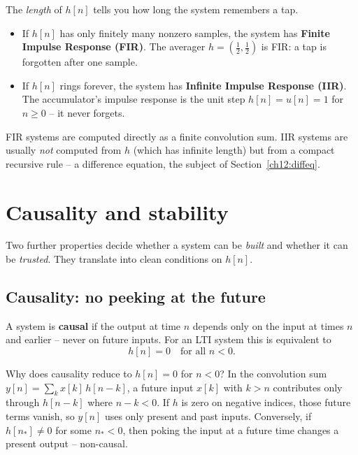 The \emph{length} of $h[n]$ tells you how long the system remembers a tap.

\begin{itemize}
  \item If $h[n]$ has only finitely many nonzero samples, the system has
        \textbf{Finite Impulse Response (FIR)}. The averager
        $h=(\tfrac12,\tfrac12)$ is FIR: a tap is forgotten after one sample.
  \item If $h[n]$ rings forever, the system has \textbf{Infinite Impulse
        Response (IIR)}. The accumulator's impulse response is the unit step
        $h[n]=u[n]=1$ for $n\ge0$ -- it never forgets.
\end{itemize}

FIR systems are computed directly as a finite convolution sum. IIR systems are
usually \emph{not} computed from $h$ (which has infinite length) but from a compact
recursive rule -- a difference equation, the subject of
Section~\ref{ch12:diffeq}.

\section{Causality and stability}
\label{ch12:causality-stability}

Two further properties decide whether a system can be \emph{built} and whether
it can be \emph{trusted}. They translate into clean conditions on $h[n]$.

\subsection*{Causality: no peeking at the future}

\begin{definition}[Causality]
\label{ch12:def-causal}
A system is \textbf{causal} if the output at time $n$ depends only on the input
at times $n$ and earlier -- never on future inputs. For an LTI system this is
equivalent to
\[
  h[n] = 0 \quad\text{for all } n < 0.
\]
\end{definition}

\begin{whybox}
Why does causality reduce to $h[n]=0$ for $n<0$? In the convolution sum
$y[n] = \sum_k x[k]\,h[n-k]$, a future input $x[k]$ with $k>n$ contributes only
through $h[n-k]$ where $n-k<0$. If $h$ is zero on negative indices, those future
terms vanish, so $y[n]$ uses only present and past inputs. Conversely, if
$h[n_*]\ne0$ for some $n_*<0$, then poking the input at a future time changes a
present output -- non-causal.
\end{whybox}

